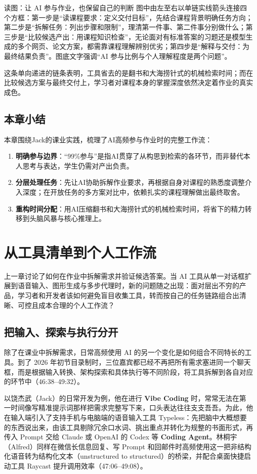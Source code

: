 \documentclass[UTF8,a4paper,11pt,fontset=fandol]{ctexart}
\begin{document}
\begin{knowledgebox}{读图：让 AI 参与作业，也保留自己的判断}
图中由左至右以单链实线箭头连接四个方框：第一步是“读课程要求：定义交付目标”，先结合课程背景明确任务方向；第二步是“拆解任务：列出步骤和限制”，理清第一件事、第二件事分别做什么；第三步是“比较候选产出：用课程知识检查”，无论面对有标准答案的习题还是模型生成的多个网页、论文方案，都需靠课程理解辨别优劣；第四步是“解释与交付：为最终结果负责”。图底文字强调“AI 参与比例与个人理解程度是两个问题”。
\end{knowledgebox}
这条单向递进的链条表明，工具省去的是翻书和大海捞针式的机械检索时间；而在比较候选方案与最终交付上，学习者对课程本身的掌握深度依然决定着作业的真实成色。
\subsection{本章小结}
本章围绕Jack的课业实践，梳理了AI高频参与作业时的完整工作流：
\begin{enumerate}
\item \textbf{明确参与边界}：“99\%参与”是指AI贯穿了从构思到检索的各环节，而非替代本人思考与表达，学生仍需对产出负责。
\item \textbf{分层处理任务}：先让AI协助拆解作业要求，再根据自身对课程的熟悉度调整介入深度；在开放任务的多方案对比中，依赖扎实的课程理解做出最终取舍。
\item \textbf{重构时间分配}：用AI压缩翻书和大海捞针式的机械检索时间，将省下的精力转移到头脑风暴与核心推理上。
\end{enumerate}
\section{从工具清单到个人工作流}
上一章讨论了如何在作业中拆解需求并验证候选答案。当 AI 工具从单一对话框扩展到语音输入、图形生成与多步代理时，新的问题随之出现：面对层出不穷的产品，学习者和开发者该如何避免盲目收集工具，转而按自己的任务链路组合出清晰、可控且成本合理的个人工作流？
\subsection{把输入、探索与执行分开}
除了在课业中拆解需求，日常高频使用 AI 的另一个变化是如何组合不同特长的工具。到了 2026 年初节目录制时，三位嘉宾都已经不再把所有需求塞进同一个聊天框，而是根据输入转换、架构探索和具体执行等不同阶段，将工具拆解到各自对应的环节中（46:38–49:32）。

以饶杰武（Jack）的日常开发为例，他在进行 \textbf{Vibe Coding} 时，常常无法在第一时间像写精准提示词那样把需求完整写下来，口头表达往往支支吾吾。为此，他在输入端引入了支持手机与电脑端的语音输入工具 Typeless：先把脑中大概想要的东西说出来，由该工具剔除冗余口水词、挑出重点并转化为规整的书面形式，再传入 Prompt 交给 Claude 或 OpenAI 的 Codex 等 \textbf{Coding Agent}。林桐宇（Alfred）同样在微信长信息回复、写 Prompt 和回邮件时高频使用这一把非结构化语音转为结构化文本（unstructured to structured）的桥梁，并配合桌面快捷启动工具 Raycast 提升调用效率（47:06–49:08）。
\end{document}
